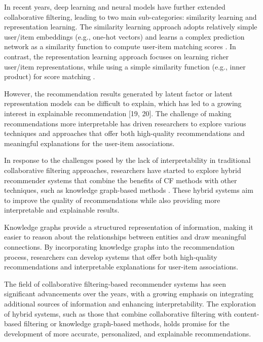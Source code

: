 \documentclass[11pt]{article}
\begin{document}
In recent years, deep learning and neural models have further extended collaborative filtering, leading to two main sub-categories: similarity learning and representation learning. The similarity learning approach adopts relatively simple user/item embeddings (e.g., one-hot vectors) and learns a complex prediction network as a similarity function to compute user-item matching scores \cite{he2017neural}. In contrast, the representation learning approach focuses on learning richer user/item representations, while using a simple similarity function (e.g., inner product) for score matching \cite{zhang2017joint, wang2019neural}.

However, the recommendation results generated by latent factor or latent representation models can be difficult to explain, which has led to a growing interest in explainable recommendation [19, 20]. The challenge of making recommendations more interpretable has driven researchers to explore various techniques and approaches that offer both high-quality recommendations and meaningful explanations for the user-item associations.

In response to the challenges posed by the lack of interpretability in traditional collaborative filtering approaches, researchers have started to explore hybrid recommender systems that combine the benefits of CF methods with other techniques, such as knowledge graph-based methods \cite{guo2020survey, zhang2016collaborative}. These hybrid systems aim to improve the quality of recommendations while also providing more interpretable and explainable results.
 
Knowledge graphs provide a structured representation of information, making it easier to reason about the relationships between entities and draw meaningful connections. By incorporating knowledge graphs into the recommendation process, researchers can develop systems that offer both high-quality recommendations and interpretable explanations for user-item associations.

The field of collaborative filtering-based recommender systems has seen significant advancements over the years, with a growing emphasis on integrating additional sources of information and enhancing interpretability. The exploration of hybrid systems, such as those that combine collaborative filtering with content-based filtering or knowledge graph-based methods, holds promise for the development of more accurate, personalized, and explainable recommendations.
\end{document}
